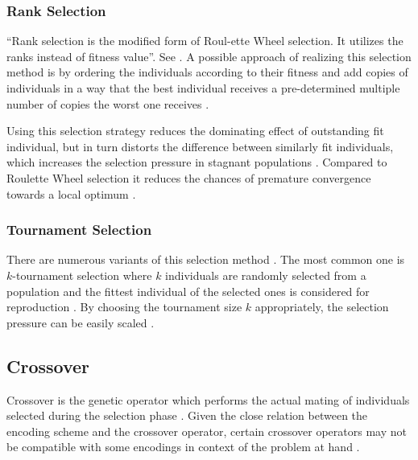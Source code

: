 \documentclass[sigconf]{acmart}
\begin{document}
\subsubsection{Rank Selection}
\enquote{Rank selection is the modified form of Roul-ette Wheel selection.
It utilizes the ranks instead of fitness value}.
See \cite{Affenzeller2009}.
A possible approach of realizing this selection method is by ordering the
individuals according to their fitness and add copies of individuals in a way
that the best individual receives a pre-determined multiple number of copies
the worst one receives \cite{Affenzeller2009}.

Using this selection strategy reduces the dominating effect of outstanding fit
individual, but in turn distorts the difference between similarly fit
individuals, which increases the selection pressure in stagnant populations
\cite{Affenzeller2009}.
Compared to Roulette Wheel selection it reduces the chances of premature
convergence towards a local optimum \cite{Katoch2021}.

\subsubsection{Tournament Selection}
There are numerous variants of this selection method \cite{Affenzeller2009}.
The most common one is $k$-tournament selection where $k$ individuals are
randomly selected from a population and the fittest individual of the selected
ones is considered for reproduction \cite{Affenzeller2009}.
By choosing the tournament size $k$ appropriately, the selection pressure
can be easily scaled \cite{Affenzeller2009}.



\subsection{Crossover}
Crossover is the genetic operator which performs the actual mating of
individuals selected during the selection phase \cite{Beligiannis2009}.
Given the close relation between the encoding scheme and the crossover operator,
certain crossover operators may not be compatible with some encodings in context
of the problem at hand \cite{Affenzeller2009}.
\end{document}
